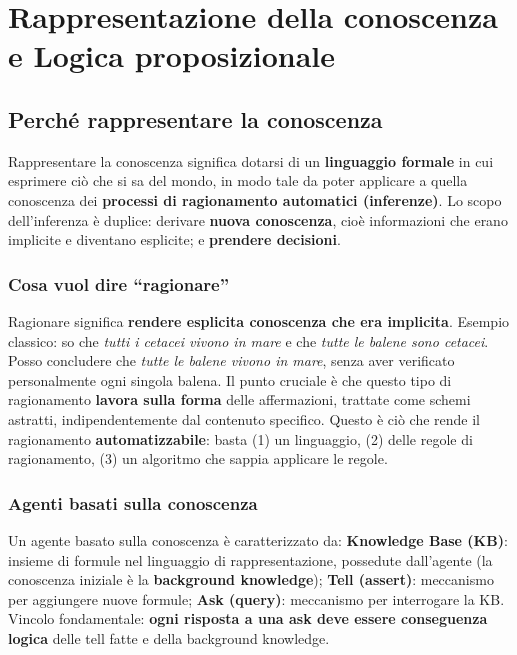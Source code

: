 \documentclass[11pt,a4paper]{report}
\begin{document}
\chapter{Rappresentazione della conoscenza e Logica proposizionale}

\section{Perché rappresentare la conoscenza}

Rappresentare la conoscenza significa dotarsi di un \textbf{linguaggio formale} in cui esprimere ciò che si sa del mondo, in modo tale da poter applicare a quella conoscenza dei \textbf{processi di ragionamento automatici (inferenze)}. Lo scopo dell'inferenza è duplice: derivare \textbf{nuova conoscenza}, cioè informazioni che erano implicite e diventano esplicite; e \textbf{prendere decisioni}.

\subsection*{Cosa vuol dire ``ragionare''}

Ragionare significa \textbf{rendere esplicita conoscenza che era implicita}. Esempio classico: so che \emph{tutti i cetacei vivono in mare} e che \emph{tutte le balene sono cetacei}. Posso concludere che \emph{tutte le balene vivono in mare}, senza aver verificato personalmente ogni singola balena. Il punto cruciale è che questo tipo di ragionamento \textbf{lavora sulla forma} delle affermazioni, trattate come schemi astratti, indipendentemente dal contenuto specifico. Questo è ciò che rende il ragionamento \textbf{automatizzabile}: basta (1) un linguaggio, (2) delle regole di ragionamento, (3) un algoritmo che sappia applicare le regole.

\subsection*{Agenti basati sulla conoscenza}

Un agente basato sulla conoscenza è caratterizzato da: \textbf{Knowledge Base (KB)}: insieme di formule nel linguaggio di rappresentazione, possedute dall'agente (la conoscenza iniziale è la \textbf{background knowledge}); \textbf{Tell (assert)}: meccanismo per aggiungere nuove formule; \textbf{Ask (query)}: meccanismo per interrogare la KB. Vincolo fondamentale: \textbf{ogni risposta a una ask deve essere conseguenza logica} delle tell fatte e della background knowledge.
\end{document}
